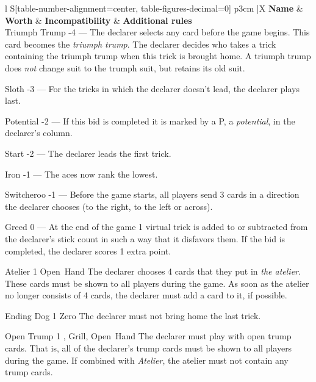 \begin{table}
	\caption{Special bids}\label{tab:specialBids}
	\begin{center}
		\begin{tabularx}{\textwidth}{
			l
			S[table-number-alignment=center, table-figures-decimal=0]
			p{3cm}
			|X
		}
			\textbf{Name} &
			\textbf{Worth} &
			\textbf{Incompatibility} &
			\textbf{Additional rules}
			\\[-3ex]

			\specialBidItem%
			{Triumph Trump}
			{-4}
			{---}
			{%
				The declarer selects any card before the game begins. This card becomes the \emph{triumph trump}. The declarer decides who takes a trick containing the triumph trump when this trick is brought home. A triumph trump does \emph{not} change suit to the trumph suit, but retains its old suit.
			}

			\specialBidItem%
			{Sloth}
			{-3}
			{---}
			{%
				For the tricks in which the declarer doesn't lead, the declarer plays last.
			}

			\specialBidItem%
			{Potential}
			{-2}
			{---}
			{%
				If this bid is completed it is marked by a P, a \emph{potential}, in the declarer's column.
			}

			\specialBidItem%
			{Start}
			{-2}
			{---}
			{%
				The declarer leads the first trick.
			}

			\specialBidItem%
			{Iron}
			{-1}
			{---}
			{%
				The aces now rank the lowest.
			}

			\specialBidItem%
			{Switcheroo}
			{-1}
			{---}
			{%
				Before the game starts, all players send 3 cards in a direction the declarer chooses (to the right, to the left or across).
			}

			\specialBidItem%
			{Greed}
			{0}
			{---}
			{%
				At the end of the game 1 virtual trick is added to or subtracted from the declarer's stick count in such a way that it disfavors them. If the bid is completed, the declarer scores 1 extra point.
			}

			\specialBidItem%
			{Atelier}
			{1}
			{Open~Hand}
			{%
				The declarer chooses 4 cards that they put in \emph{the atelier}. These cards must be shown to all players during the game. As soon as the atelier no longer consists of 4 cards, the declarer must add a card to it, if possible.
			}

			\specialBidItem%
			{Ending Dog}
			{1}
			{Zero}
			{%
				The declarer must not bring home the last trick.
			}

			\specialBidItem%
			{Open Trump}
			{1}
			{\nonTrump, Grill, Open~Hand}
			{%
				The declarer must play with open trump cards. That is, all of the declarer’s trump cards must be shown to all players during the game. If combined with \emph{Atelier}, the atelier must not contain any trump cards.
			}


\end{tabularx}
\end{center}
\end{table}

